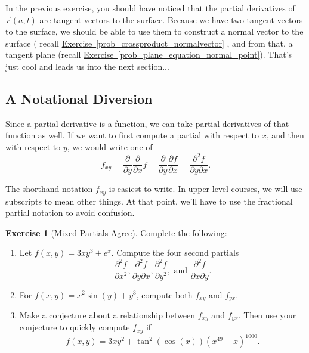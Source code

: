 \documentclass[10pt,]{book}
\theoremstyle{plain}
\theoremstyle{definition}
\theoremstyle{definition}
\theoremstyle{definition}
\theoremstyle{definition}
\newtheorem{exploration}[project]{Exercise}
\theoremstyle{definition}
\numberwithin{equation}{section}
\newcommand{\ds}{\displaystyle}
\begin{document}
In the previous exercise, you should have noticed that the partial derivatives of \(\vec r(a,t)\) are tangent vectors to the surface. Because we have two tangent vectors to the surface, we should be able to use them to construct a normal vector to the surface ( recall \hyperref[prob_crossproduct_normalvector]{Exercise~\ref{prob_crossproduct_normalvector}} , and from that, a tangent plane (recall \hyperref[prob_plane_equation_normal_point]{Exercise~\ref{prob_plane_equation_normal_point}}). That's just cool and leads us into the next section...%
\typeout{************************************************}
\typeout{************************************************}
\subsection[{A Notational Diversion}]{A Notational Diversion}\label{subsection-32}
Since a partial derivative is a function, we can take partial derivatives of that function as well. If we want to first compute a partial with respect to \(x\), and then with respect to \(y\), we would write one of%
\begin{equation*}
f_{xy}=\ds\frac{\partial}{\partial y}\frac{\partial}{\partial x}f = \frac{\partial}{\partial y}\frac{\partial f}{\partial x} = \frac{\partial^2 f}{\partial y \partial x}.
\end{equation*}
%
\par
The shorthand notation \(f_{xy}\) is easiest to write. In upper-level courses, we will use subscripts to mean other things. At that point, we'll have to use the fractional partial notation to avoid confusion.%
\begin{exploration}[Mixed Partials Agree]\label{second_partials_agree}
Complete the following:%
\begin{enumerate}[font=\bfseries,label=(\alph*),ref=\alph*]
\item\label{task-304} Let \(f(x,y)=3xy^3+e^{x}.\) Compute the four second partials%
\begin{equation*}
\ds \frac{\partial^2 f}{ \partial x^2}, \ds\frac{\partial^2 f}{\partial y \partial x}, \ds\frac{\partial^2 f}{\partial y^2},  \text{ and } \ds\frac{\partial^2 f}{\partial x \partial y}.
\end{equation*}
%
\item\label{task-305} For \(f(x,y)=x^2\sin(y)+y^3\), compute both \(f_{xy}\) and \(f_{yx}\).%
\item\label{task-306} Make a conjecture about a relationship between \(f_{xy}\) and \(f_{yx}\). Then use your conjecture to quickly compute \(f_{xy}\) if%
\begin{equation*}
f(x,y)=3xy^2+\tan^{2}(\cos(x)) (x^{49}+x)^{1000}.
\end{equation*}
%
\end{enumerate}
\end{exploration}
\typeout{************************************************}
\typeout{************************************************}
\end{document}
